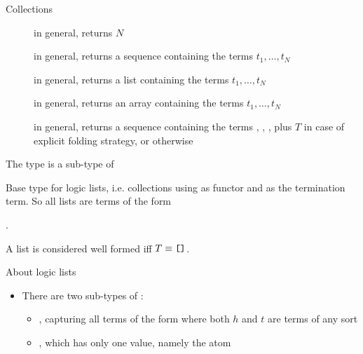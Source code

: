 \documentclass[handout]{beamer}
\begin{document}
\begin{frame}[allowframebreaks]{Collections}
\begin{description}
        \item[] in general, returns $N$
        \item[] in general, returns a sequence containing the terms $t_1, \ldots, t_N$
        \item[] in general, returns a list containing the terms $t_1, \ldots, t_N$
        \item[] in general, returns an array containing the terms $t_1, \ldots, t_N$
        \item[] in general, returns a sequence containing the terms , , \pl{\ldots}, plus $T$ in case of explicit folding strategy, or  otherwise
    \end{description}

    \framebreak

    \begin{block}{The  type is a sub-type of }
        \begin{center}
            Base type for logic lists, i.e. collections using  as functor and  as the termination term.
            So all lists are terms of the form
            \begin{center}
                .
            \end{center}
            A list is considered well formed iff $T \equiv \texttt{[]}$.
        \end{center}
    \end{block}
    \begin{alertblock}{About logic lists}
        \begin{itemize}
            \item There are two sub-types of :
            \begin{itemize}
                \item \alert{}, capturing all terms of the form  where both $h$ and $t$ are terms of any sort
                \item \alert{}, which has only one value, namely the atom 
            \end{itemize}


\end{itemize}
\end{alertblock}
\end{frame}
\end{document}

